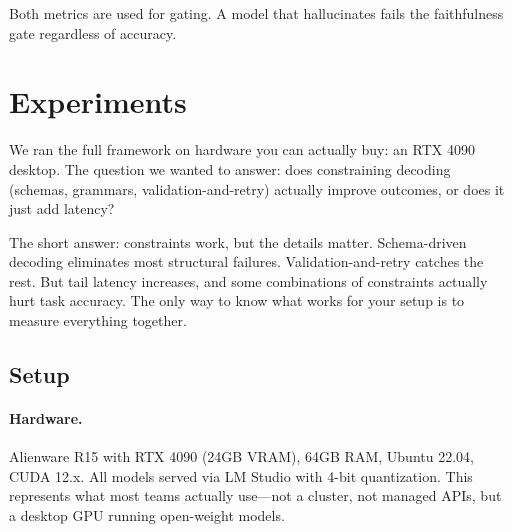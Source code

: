 \documentclass[11pt]{article}
\begin{document}
Both metrics are used for gating.
A model that hallucinates fails the faithfulness gate regardless of accuracy.


\section{Experiments}
\label{sec:experiments}

We ran the full framework on hardware you can actually buy: an RTX 4090 desktop.
The question we wanted to answer: does constraining decoding (schemas, grammars, validation-and-retry) actually improve outcomes, or does it just add latency?

The short answer: constraints work, but the details matter.
Schema-driven decoding eliminates most structural failures.
Validation-and-retry catches the rest.
But tail latency increases, and some combinations of constraints actually hurt task accuracy.
The only way to know what works for your setup is to measure everything together.

\subsection{Setup}

\paragraph{Hardware.}
Alienware R15 with RTX 4090 (24GB VRAM), 64GB RAM, Ubuntu 22.04, CUDA 12.x.
All models served via LM Studio with 4-bit quantization.
This represents what most teams actually use---not a cluster, not managed APIs, but a desktop GPU running open-weight models.
\end{document}
